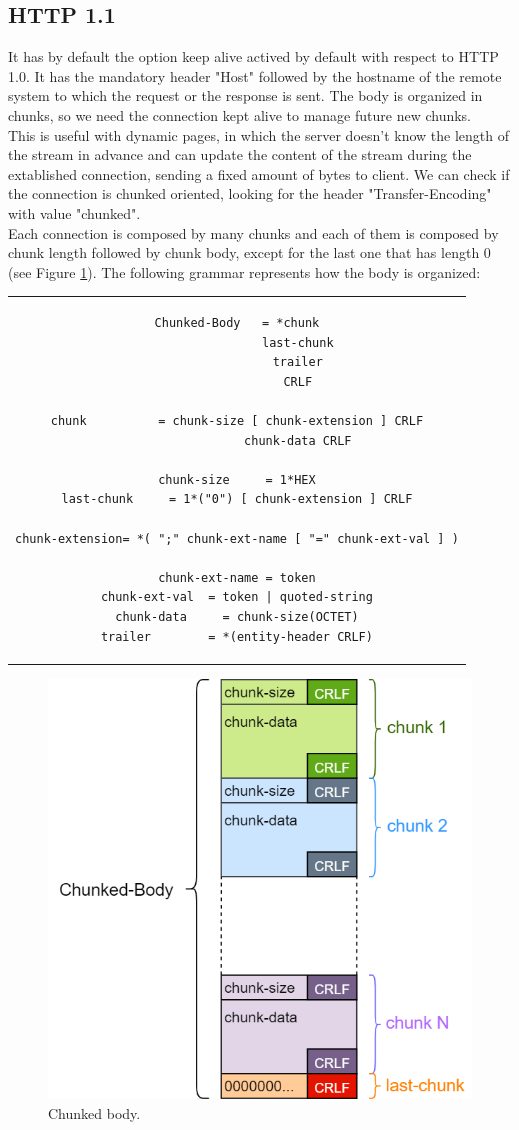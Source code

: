 \subsection{HTTP 1.1}
It has by default the option keep alive actived by default with respect to HTTP 1.0. It has the mandatory header "Host" followed by the hostname of the remote system to which the request or the response is sent. The body is organized in chunks, so we need the connection kept alive to manage future new chunks.\\
This is useful with dynamic pages, in which the server doesn't know the length of the stream in advance and can update the content of the stream during the extablished connection, sending a fixed amount of bytes to client. We can check if the connection is chunked oriented, looking for the header "Transfer-Encoding" with value "chunked".\\ 
Each connection is composed by many chunks and each of them is composed by chunk length followed by chunk body, except for the last one that has length 0 (see Figure \ref{chunked_body}). The following grammar represents how the body is organized:
\begin{center}
\begin{tabular}{c}
\begin{lstlisting}[linewidth=320pt, basicstyle=\footnotesize\sffamily,]
Chunked-Body   = *chunk
                 last-chunk
                 trailer
                 CRLF

chunk          = chunk-size [ chunk-extension ] CRLF
                 chunk-data CRLF

chunk-size     = 1*HEX
last-chunk     = 1*("0") [ chunk-extension ] CRLF

chunk-extension= *( ";" chunk-ext-name [ "=" chunk-ext-val ] )

chunk-ext-name = token
chunk-ext-val  = token | quoted-string
chunk-data     = chunk-size(OCTET)
trailer        = *(entity-header CRLF)
\end{lstlisting}
\end{tabular}
\end{center}

\begin{figure}[h]
\centering
\includegraphics[scale=0.5]{Images/HTTP/Chunked-Body}\caption{\footnotesize{Chunked body.}}\label{chunked_body}
\end{figure}